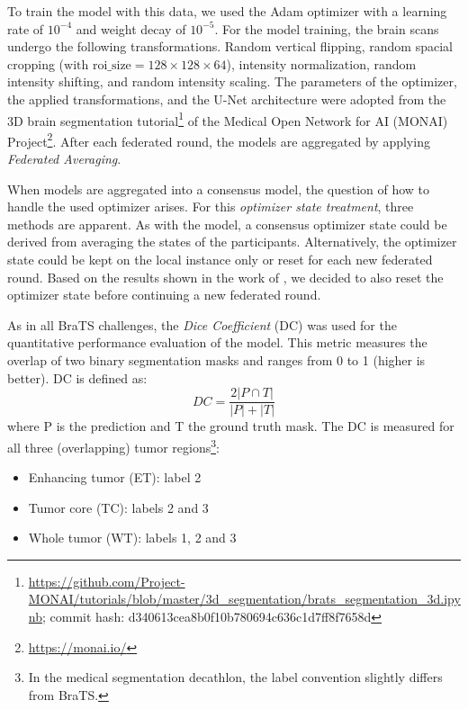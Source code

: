 To train the model with this data, we used the Adam optimizer \citep{Kingma2015} with a 
learning rate of $10^{-4}$
and weight decay of $10^{-5}$.
For the model training, the brain scans undergo the following transformations.
Random vertical flipping,
random spacial cropping ($\textrm{with roi\_size} =  128 \times 128 \times 64$),
intensity normalization,
random intensity shifting,
and random intensity scaling.
The parameters of the optimizer, the applied transformations, and the U-Net architecture were adopted from the 3D brain segmentation tutorial\footnote{\url{https://github.com/Project-MONAI/tutorials/blob/master/3d\_segmentation/brats\_segmentation\_3d.ipynb}; commit hash: d340613cea8b0f10b780694c636c1d7ff8f7658d}
of the Medical Open Network for AI (MONAI) Project\footnote{\url{https://monai.io/}}. After each federated round, the models are aggregated by applying \textit{Federated Averaging}.

When models are aggregated into a consensus model, the question of how to handle the used optimizer arises. For this \textit{optimizer state treatment}, three methods are apparent. As with the model, a consensus optimizer state could be derived from averaging the states of the participants. Alternatively, the optimizer state could be kept on the local instance only or reset for each new federated round. Based on the results shown in the work of \cite{Li2019Privacy-preservingSegmentation}, we decided to also reset the optimizer state before continuing a new federated round.

As in all BraTS challenges, the \textit{Dice Coefficient} (DC) was used for the quantitative performance evaluation of the model.
This metric measures the overlap of two binary segmentation masks and ranges from 0 to 1 (higher is better). DC is defined as:
\begin{equation}
DC=\frac{2 |P \cap T|}{|P| + |T|} \label{eq:dice}
\end{equation}
where P is the prediction and T the ground truth mask. The DC is measured for all three (overlapping) tumor regions\footnote{In the medical segmentation decathlon, the label convention slightly differs from BraTS.}:
\begin{itemize}
    \item Enhancing tumor (ET): label 2
    \item Tumor core (TC): labels 2 and 3
    \item Whole tumor (WT): labels 1, 2 and 3
\end{itemize}

